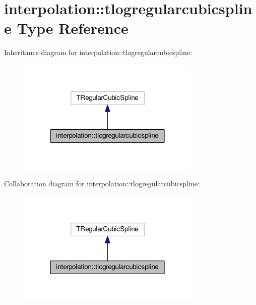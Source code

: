 \hypertarget{structinterpolation_1_1tlogregularcubicspline}{}\section{interpolation\+:\+:tlogregularcubicspline Type Reference}
\label{structinterpolation_1_1tlogregularcubicspline}


Inheritance diagram for interpolation\+:\+:tlogregularcubicspline\+:
\nopagebreak
\begin{figure}[H]
\begin{center}
\leavevmode
\includegraphics[width=248pt]{structinterpolation_1_1tlogregularcubicspline__inherit__graph}
\end{center}
\end{figure}


Collaboration diagram for interpolation\+:\+:tlogregularcubicspline\+:
\nopagebreak
\begin{figure}[H]
\begin{center}
\leavevmode
\includegraphics[width=248pt]{structinterpolation_1_1tlogregularcubicspline__coll__graph}
\end{center}
\end{figure}
